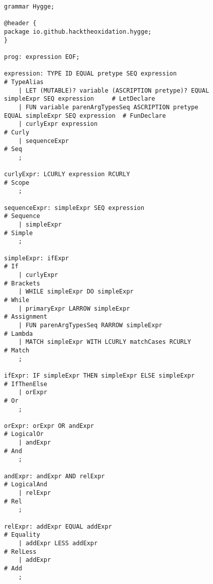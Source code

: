 \begin{figure}[H]
\centering  
\begin{lstlisting}
grammar Hygge;

@header {
package io.github.hacktheoxidation.hygge;
}

prog: expression EOF;

expression: TYPE ID EQUAL pretype SEQ expression                                        # TypeAlias
    | LET (MUTABLE)? variable (ASCRIPTION pretype)? EQUAL simpleExpr SEQ expression     # LetDeclare
    | FUN variable parenArgTypesSeq ASCRIPTION pretype EQUAL simpleExpr SEQ expression  # FunDeclare
    | curlyExpr expression                                                              # Curly
    | sequenceExpr                                                                      # Seq
    ;

curlyExpr: LCURLY expression RCURLY                                       # Scope
    ;

sequenceExpr: simpleExpr SEQ expression                                   # Sequence
    | simpleExpr                                                          # Simple
    ;

simpleExpr: ifExpr                                                        # If
    | curlyExpr                                                           # Brackets
    | WHILE simpleExpr DO simpleExpr                                      # While
    | primaryExpr LARROW simpleExpr                                       # Assignment
    | FUN parenArgTypesSeq RARROW simpleExpr                              # Lambda
    | MATCH simpleExpr WITH LCURLY matchCases RCURLY                      # Match
    ;

ifExpr: IF simpleExpr THEN simpleExpr ELSE simpleExpr                     # IfThenElse
    | orExpr                                                              # Or
    ;

orExpr: orExpr OR andExpr                                                 # LogicalOr
    | andExpr                                                             # And
    ;

andExpr: andExpr AND relExpr                                              # LogicalAnd
    | relExpr                                                             # Rel
    ;

relExpr: addExpr EQUAL addExpr                                            # Equality
    | addExpr LESS addExpr                                                # RelLess
    | addExpr                                                             # Add
    ;


\end{lstlisting}
\end{figure}
